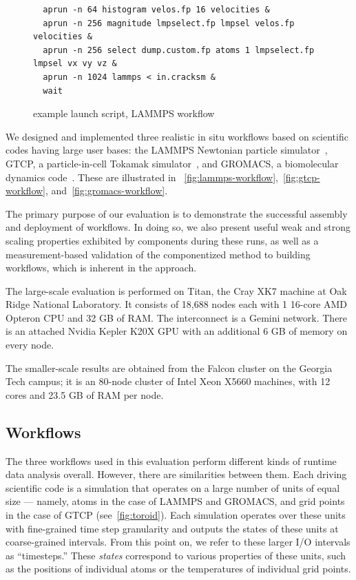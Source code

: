 \begin{figure}
  \begin{lstlisting}
  aprun -n 64 histogram velos.fp 16 velocities &
  aprun -n 256 magnitude lmpselect.fp lmpsel velos.fp velocities &
  aprun -n 256 select dump.custom.fp atoms 1 lmpselect.fp lmpsel vx vy vz &
  aprun -n 1024 lammps < in.cracksm &
  wait
  \end{lstlisting}
  \vspace{-0.07in}
  \caption{\sys example launch script, LAMMPS workflow}
  \label{fig:launch-script}
\end{figure}

We designed and implemented three realistic in situ workflows based on
scientific codes having large user bases: the LAMMPS Newtonian particle
simulator~\cite{plimpton:1997:lammps}, GTCP, a particle-in-cell Tokamak
simulator~\cite{lin:gtc}, and GROMACS,
a biomolecular dynamics code~\cite{hess2008gromacs}.
These are illustrated in
~\autoref{fig:lammps-workflow},~\autoref{fig:gtcp-workflow},
and~\autoref{fig:gromacs-workflow}.

The primary purpose of our evaluation is to demonstrate the
successful assembly and deployment of \sys workflows. In doing so, 
we also present useful
weak and strong scaling properties exhibited by \sys components
during these runs, as well as a measurement-based validation of
the componentized method to building workflows, which is inherent in the \sys approach.

The large-scale evaluation is performed on Titan, the Cray XK7 machine at Oak Ridge
National Laboratory. It consists of 18,688 nodes each with 1 16-core AMD
Opteron CPU and 32 GB of RAM. The interconnect is a Gemini network. There is an
attached Nvidia Kepler K20X GPU with an additional 6 GB of memory on every
node.

The smaller-scale results are obtained from the Falcon cluster
on the Georgia Tech campus; it is an 80-node cluster of Intel Xeon X5660 machines,
with 12 cores and 23.5 GB of RAM per node. 

\subsection{Workflows}

The three \sys workflows used in this evaluation perform
different kinds of runtime data analysis overall.
However, there are similarities between them.
Each driving scientific code is a simulation that
operates on a large number of units of equal size --- namely, atoms
in the case of LAMMPS and GROMACS, and grid points
in the case of GTCP (see~\autoref{fig:toroid}).
Each simulation operates over these units
with fine-grained time step granularity
and outputs the states of these units at coarse-grained
intervals. From this point on, we refer to these larger
I/O intervals as ``timesteps.''
These \textit{states} correspond to various properties
of these units, such as the positions of individual atoms or the
temperatures of individual grid points.

